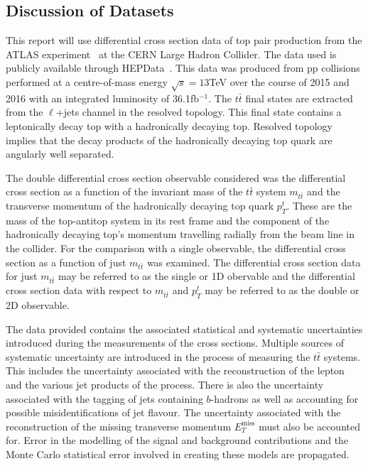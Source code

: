 \documentclass[a4paper,11pt]{article}
\begin{document}
\subsection{Discussion of Datasets}
This report will use differential cross section data of top pair production from the ATLAS experiment~\cite{ATLAS:2019hxz} at the CERN Large Hadron Collider.
The data used is publicly available through HEPData~\cite{hepdata1750330}.
This data was produced from pp collisions performed at a centre-of-mass energy $\sqrt{s} = 13$TeV over the course of 2015 and 2016 with an integrated luminosity of 36.1fb$^{-1}$.
The $t\bar{t}$ final states are extracted from the $\ell$+jets channel in the resolved topology.
This final state contains a leptonically decay top with a hadronically decaying top.
Resolved topology implies that the decay products of the hadronically decaying top quark are angularly well separated.

The double differential cross section observable considered was the differential cross section as a function of the invariant mass of the $t\bar{t}$ system $m_{t\bar{t}}$ and the transverse momentum of the hadronically decaying top quark $p_{T}^{t}$.
These are the mass of the top-antitop system in its rest frame and the component of the hadronically decaying top's momentum travelling radially from the beam line in the collider.
For the comparison with a single observable, the differential cross section as a function of just $m_{t\bar{t}}$ was examined.
The differential cross section data for just $m_{t\bar{t}}$ may be referred to as the single or 1D obervable and the differential cross section data with respect to $m_{t\bar{t}}$ and $p_{T}^{t}$ may be referred to as the double or 2D observable.

The data provided contains the associated statistical and systematic uncertainties introduced during the measurements of the cross sections.
Multiple sources of systematic uncertainty are introduced in the process of measuring the $t\bar{t}$ systems.
This includes the uncertainty associated with the reconstruction of the lepton and the various jet products of the process.
There is also the uncertainty associated with the tagging of jets containing $b$-hadrons as well as accounting for possible misidentifications of jet flavour.
The uncertainty associated with the reconstruction of the missing transverse momentum $E_{T}^{\text{miss}}$ must also be accounted for.
Error in the modelling of the signal and background contributions and the Monte Carlo statistical error involved in creating these models are propagated.
\end{document}
